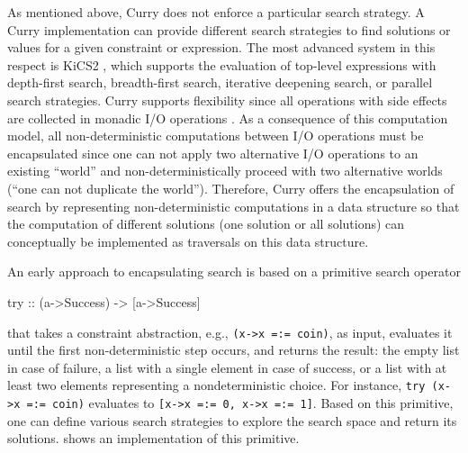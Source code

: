 \documentclass[english]{lni}
\newcommand{\code}[1]{\texttt{#1}}
\newcommand{\bs}{\char92} %
\begin{document}
As mentioned above, Curry does not enforce a particular search
strategy. A Curry implementation
can provide different search strategies to find solutions
or values for a given constraint or expression.
The most advanced system in this respect is
KiCS2 \cite{BrasselHanusPeemoellerReck11},
which supports the evaluation of top-level expressions
with depth-first search, breadth-first search,
iterative deepening search, or parallel search strategies.
Curry supports flexibility since all operations with side effects
are collected in monadic I/O operations \cite{Wadler97}.
As a consequence of this computation model,
all non-deterministic computations between I/O operations
must be encapsulated since one can not apply two alternative
I/O operations to an existing ``world''
and non-deterministically proceed with two alternative worlds
(``one can not duplicate the world'').
Therefore, Curry offers the encapsulation of search
by representing non-deterministic computations
in a data structure so that the computation of different solutions
(one solution or all solutions) can conceptually be implemented
as traversals on this data structure.

An early approach to encapsulating search
\cite{HanusSteiner98PLILP,Lux99FLOPS}
is based on a primitive search operator
\begin{curry}
try :: (a->Success) -> [a->Success]
\end{curry}
that takes a constraint abstraction, e.g., \code{(\bs{}x->x\,=:=\,coin)},
as input, evaluates it until the first non-deterministic step occurs,
and returns the result: the empty list in case of failure, a list with a single
element in case of success, or a list with at least two elements representing
a nondeterministic choice. For instance,
\code{try\,(\bs{}x->x\,=:=\,coin)} evaluates to
\code{[\bs{}x->x\,=:=\,0,\,\bs{}x->x\,=:=\,1]}.
Based on this primitive, one can define various search strategies
to explore the search space and return its solutions.
\cite{Lux99FLOPS} shows an implementation of this primitive.
\end{document}
